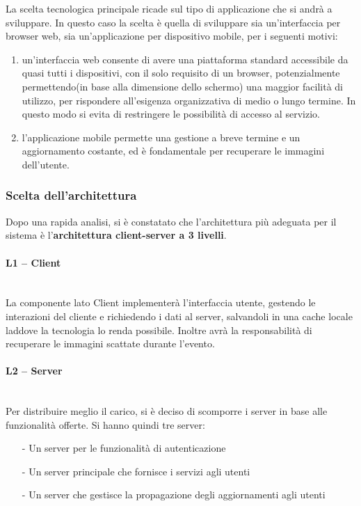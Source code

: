 La scelta tecnologica principale ricade sul tipo di applicazione che si andrà a
sviluppare.
In questo caso la scelta è quella di sviluppare sia un'interfaccia per browser web, sia un'applicazione per dispositivo mobile, per i seguenti motivi:
\begin{enumerate}
    \item un'interfaccia web consente di avere una
          piattaforma standard accessibile da quasi tutti i dispositivi, con il solo
          requisito di un browser, potenzialmente permettendo(in base alla dimensione dello schermo) una maggior facilità di utilizzo, per rispondere all'esigenza organizzativa di medio o lungo termine.
          In questo modo si evita di restringere le possibilità di accesso al servizio.
    \item  l'applicazione mobile permette una gestione a breve termine e un aggiornamento costante, ed è fondamentale per recuperare le immagini dell'utente.
\end{enumerate}
\newpage
\subsubsection{Scelta dell'architettura}

Dopo una rapida analisi, si è constatato che l'architettura più adeguata per il
sistema è l'\textbf{architettura client-server a 3 livelli}.

\paragraph{L1 -- Client}\mbox{}\\
La componente lato Client implementerà l'interfaccia utente, gestendo le interazioni del cliente e richiedendo i dati al server,
salvandoli in una cache locale laddove la tecnologia lo renda possibile. Inoltre avrà la responsabilità di recuperare le immagini scattate durante l'evento.

\paragraph{L2 -- Server}\mbox{}\\
Per distribuire meglio il carico, si è deciso di scomporre i server in base alle funzionalità offerte. Si hanno quindi tre server:

\begin{itemize}
    \item[-] Un server per le funzionalità di autenticazione
    \item[-] Un server principale che fornisce i servizi agli utenti
    \item[-] Un server che gestisce la propagazione degli aggiornamenti agli utenti
\end{itemize}

